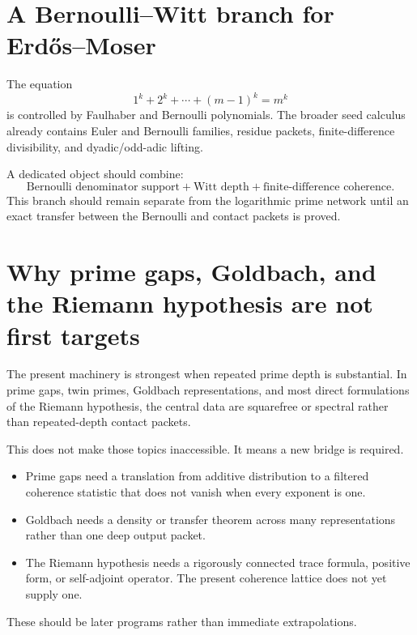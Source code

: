 \section{A Bernoulli--Witt branch for Erd\H{o}s--Moser}
The equation
\[
1^k+2^k+\cdots+(m-1)^k=m^k
\]
is controlled by Faulhaber and Bernoulli polynomials. The broader seed calculus already contains Euler and Bernoulli families, residue packets, finite-difference divisibility, and dyadic/odd-adic lifting.

A dedicated object should combine:
\[
\boxed{
\text{Bernoulli denominator support}
+
\text{Witt depth}
+
\text{finite-difference coherence}.
}
\]
This branch should remain separate from the logarithmic prime network until an exact transfer between the Bernoulli and contact packets is proved.

\section{Why prime gaps, Goldbach, and the Riemann hypothesis are not first targets}
The present machinery is strongest when repeated prime depth is substantial. In prime gaps, twin primes, Goldbach representations, and most direct formulations of the Riemann hypothesis, the central data are squarefree or spectral rather than repeated-depth contact packets.

This does not make those topics inaccessible. It means a new bridge is required.

\begin{itemize}[leftmargin=1.5em]
\item Prime gaps need a translation from additive distribution to a filtered coherence statistic that does not vanish when every exponent is one.
\item Goldbach needs a density or transfer theorem across many representations rather than one deep output packet.
\item The Riemann hypothesis needs a rigorously connected trace formula, positive form, or self-adjoint operator. The present coherence lattice does not yet supply one.
\end{itemize}

These should be later programs rather than immediate extrapolations.

